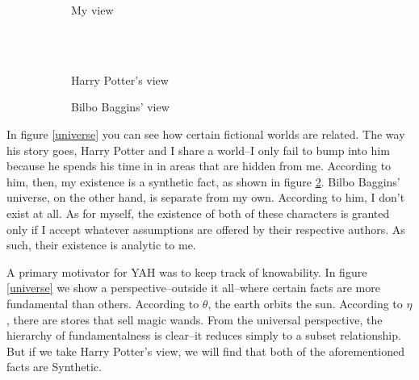 \documentclass[12pt]{article}
\begin{document}
\begin{flushleft}
\begin{figure}[h]
\begin{subfigure}{.25\linewidth}
{{                    \pline{\mathnormal{\beta}}
                }
                {
                }
            }
        \caption{My view}
        \label{me}
     \end{subfigure}%
    \begin{subfigure}{.25\linewidth}
        \centering
        \hspace*{3em}%
        \fitchprf
        {
            \pline{\mathnormal{\theta}} \\
            \pline{\mathnormal{\eta}} \\
        }
        {
            \pline{\bigstar}
        }
        \caption{Harry Potter's view}
        \label{harry}
     \end{subfigure}%
     \begin{subfigure}{.25\linewidth}
        \centering
        \hspace*{3em}%
        \fitchprf
        {
            \pline{\mathnormal{\zeta}}
        }
        {
            \pline{\bigstar}
        }
        \caption{Bilbo Baggins' view}
        \label{bilbo}
    \end{subfigure}
    \caption{}
    \label{fiction}
\end{figure}

In figure \ref{universe} you can see how certain fictional worlds are related.
The way his story goes, Harry Potter and I share a world--I only fail to bump into him because he spends his time in in areas that are hidden from me.
According to him, then, my existence is a synthetic fact, as shown in figure \ref{harry}.
Bilbo Baggins' universe, on the other hand, is separate from my own.
According to him, I don't exist at all.
As for myself, the existence of both of these characters is granted only if I accept whatever assumptions are offered by their respective authors.
As such, their existence is analytic to me.

A primary motivator for YAH was to keep track of knowability.
In figure \ref{universe} we show a perspective--outside it all--where certain facts are more fundamental than others.
According to $\theta$, the earth orbits the sun.
According to $\eta$, there are stores that sell magic wands.
From the universal perspective, the hierarchy of fundamentalness is clear--it reduces simply to a subset relationship.
But if we take Harry Potter's view, we will find that both of the aforementioned facts are Synthetic.


\end{flushleft}
\end{document}
